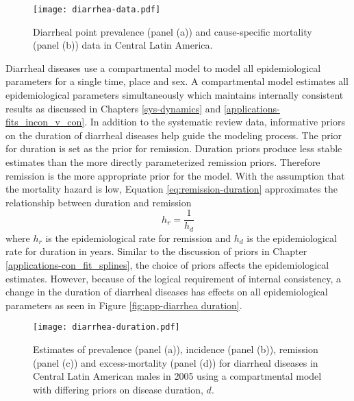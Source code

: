     \begin{figure}[h]
        \begin{center}
            \texttt{[image: diarrhea-data.pdf]}
            \caption{Diarrheal point prevalence (panel (a)) and
              cause-specific mortality (panel (b)) data in Central
              Latin America.}
            \label{fig:app-diarrhea data}
        \end{center}
    \end{figure}

Diarrheal diseases use a compartmental model to model all
epidemiological parameters for a single time, place and sex.  A
compartmental model estimates all epidemiological parameters
simultaneously which maintains internally consistent results as
discussed in Chapters \ref{sys-dynamics} and
\ref{applications-fits_incon_v_con}.  In addition to the systematic
review data, informative priors on the duration of diarrheal diseases
help guide the modeling process.  The prior for duration is set as the
prior for remission.  Duration priors produce less stable estimates
than the more directly parameterized remission priors.  Therefore
remission is the more appropriate prior for the model.  With the
assumption that the mortality hazard is low, Equation
\ref{eq:remission-duration} approximates the relationship between
duration and remission
    \begin{equation} \label{eq:remission-duration}
    	h_{r} = \frac{1}{h_{d}}
    \end{equation}
where $h_{r}$ is the epidemiological rate for remission and $h_{d}$ is
the epidemiological rate for duration in years.  Similar to the
discussion of priors in Chapter \ref{applications-con_fit_splines},
the choice of priors affects the epidemiological estimates.  However,
because of the logical requirement of internal consistency, a change
in the duration of diarrheal diseases has effects on all
epidemiological parameters as seen in Figure \ref{fig:app-diarrhea
  duration}.

    \begin{figure}[h]
        \begin{center}
            \texttt{[image: diarrhea-duration.pdf]}
            \caption{Estimates of prevalence (panel (a)), incidence
              (panel (b)), remission (panel (c)) and excess-mortality
              (panel (d)) for diarrheal diseases in Central Latin
              American males in 2005 using a compartmental model with
              differing priors on disease duration, $d$.}
            \label{fig:app-diarrhea duration}
        \end{center}
    \end{figure}
